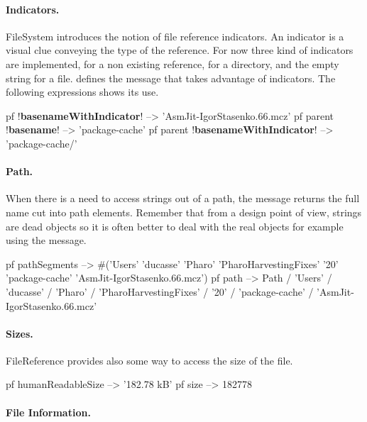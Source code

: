 \documentclass[a4paper,10pt,twoside]{book}
\begin{document}
\paragraph{Indicators.} 
FileSystem introduces the notion of file reference indicators. An indicator is a visual clue conveying the type of the reference.
For now three kind of indicators are implemented,   for a non existing reference,  for a directory,
and the empty string for a file.  defines the  message  that takes advantage of indicators.
The following expressions shows its use. 


\begin{code}{}
pf  !\textbf{basenameWithIndicator}!
	--> 'AsmJit-IgorStasenko.66.mcz'
pf parent  !\textbf{basename}!
	--> 'package-cache'
pf parent !\textbf{basenameWithIndicator}!
	--> 'package-cache/'
\end{code}


\paragraph{Path.}

When there is a need to access strings out of a path, the message  returns the full name cut into path elements. 
Remember that from a design point of view, strings are dead objects so it is often better to deal with the real objects for example using
the  message. 


\begin{code}{}
pf pathSegments  
	-->  #('Users' 'ducasse' 'Pharo' 'PharoHarvestingFixes' '20' 'package-cache' 'AsmJit-IgorStasenko.66.mcz')
pf path
    -->  Path / 'Users' / 'ducasse' / 'Pharo' / 'PharoHarvestingFixes' / '20' / 'package-cache' / 'AsmJit-IgorStasenko.66.mcz'
\end{code}

\paragraph{Sizes.}
FileReference provides also some way to access the size of the file. 

\begin{code}{}
pf humanReadableSize 
	--> '182.78 kB'
pf size 
	--> 182778
\end{code}  


\paragraph{File Information.}
\end{document}
